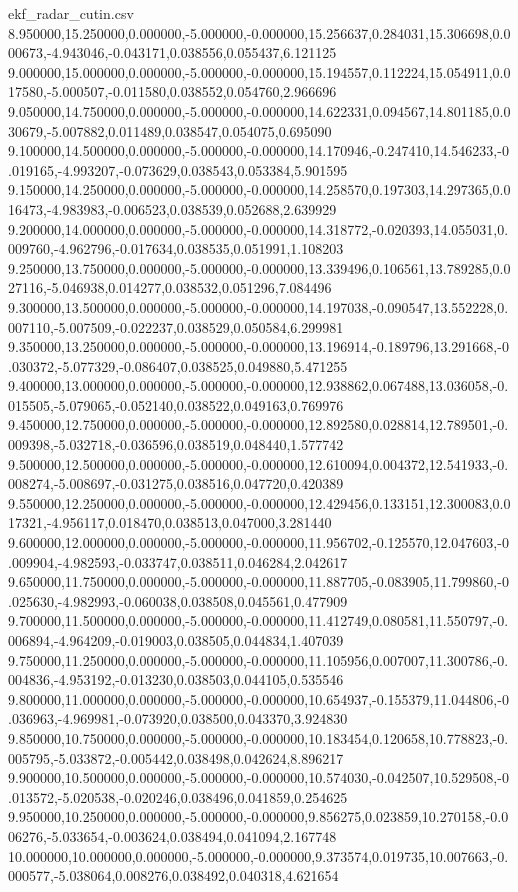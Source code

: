 \begin{filecontents*}[overwrite]{ekf_radar_cutin.csv}
8.950000,15.250000,0.000000,-5.000000,-0.000000,15.256637,0.284031,15.306698,0.000673,-4.943046,-0.043171,0.038556,0.055437,6.121125
9.000000,15.000000,0.000000,-5.000000,-0.000000,15.194557,0.112224,15.054911,0.017580,-5.000507,-0.011580,0.038552,0.054760,2.966696
9.050000,14.750000,0.000000,-5.000000,-0.000000,14.622331,0.094567,14.801185,0.030679,-5.007882,0.011489,0.038547,0.054075,0.695090
9.100000,14.500000,0.000000,-5.000000,-0.000000,14.170946,-0.247410,14.546233,-0.019165,-4.993207,-0.073629,0.038543,0.053384,5.901595
9.150000,14.250000,0.000000,-5.000000,-0.000000,14.258570,0.197303,14.297365,0.016473,-4.983983,-0.006523,0.038539,0.052688,2.639929
9.200000,14.000000,0.000000,-5.000000,-0.000000,14.318772,-0.020393,14.055031,0.009760,-4.962796,-0.017634,0.038535,0.051991,1.108203
9.250000,13.750000,0.000000,-5.000000,-0.000000,13.339496,0.106561,13.789285,0.027116,-5.046938,0.014277,0.038532,0.051296,7.084496
9.300000,13.500000,0.000000,-5.000000,-0.000000,14.197038,-0.090547,13.552228,0.007110,-5.007509,-0.022237,0.038529,0.050584,6.299981
9.350000,13.250000,0.000000,-5.000000,-0.000000,13.196914,-0.189796,13.291668,-0.030372,-5.077329,-0.086407,0.038525,0.049880,5.471255
9.400000,13.000000,0.000000,-5.000000,-0.000000,12.938862,0.067488,13.036058,-0.015505,-5.079065,-0.052140,0.038522,0.049163,0.769976
9.450000,12.750000,0.000000,-5.000000,-0.000000,12.892580,0.028814,12.789501,-0.009398,-5.032718,-0.036596,0.038519,0.048440,1.577742
9.500000,12.500000,0.000000,-5.000000,-0.000000,12.610094,0.004372,12.541933,-0.008274,-5.008697,-0.031275,0.038516,0.047720,0.420389
9.550000,12.250000,0.000000,-5.000000,-0.000000,12.429456,0.133151,12.300083,0.017321,-4.956117,0.018470,0.038513,0.047000,3.281440
9.600000,12.000000,0.000000,-5.000000,-0.000000,11.956702,-0.125570,12.047603,-0.009904,-4.982593,-0.033747,0.038511,0.046284,2.042617
9.650000,11.750000,0.000000,-5.000000,-0.000000,11.887705,-0.083905,11.799860,-0.025630,-4.982993,-0.060038,0.038508,0.045561,0.477909
9.700000,11.500000,0.000000,-5.000000,-0.000000,11.412749,0.080581,11.550797,-0.006894,-4.964209,-0.019003,0.038505,0.044834,1.407039
9.750000,11.250000,0.000000,-5.000000,-0.000000,11.105956,0.007007,11.300786,-0.004836,-4.953192,-0.013230,0.038503,0.044105,0.535546
9.800000,11.000000,0.000000,-5.000000,-0.000000,10.654937,-0.155379,11.044806,-0.036963,-4.969981,-0.073920,0.038500,0.043370,3.924830
9.850000,10.750000,0.000000,-5.000000,-0.000000,10.183454,0.120658,10.778823,-0.005795,-5.033872,-0.005442,0.038498,0.042624,8.896217
9.900000,10.500000,0.000000,-5.000000,-0.000000,10.574030,-0.042507,10.529508,-0.013572,-5.020538,-0.020246,0.038496,0.041859,0.254625
9.950000,10.250000,0.000000,-5.000000,-0.000000,9.856275,0.023859,10.270158,-0.006276,-5.033654,-0.003624,0.038494,0.041094,2.167748
10.000000,10.000000,0.000000,-5.000000,-0.000000,9.373574,0.019735,10.007663,-0.000577,-5.038064,0.008276,0.038492,0.040318,4.621654
\end{filecontents*}

